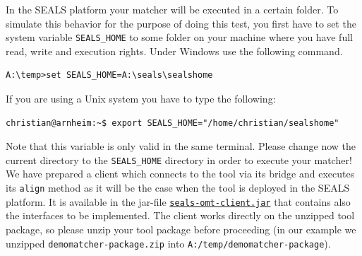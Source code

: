 \documentclass{article}
\begin{document}
In the SEALS platform your matcher will be executed in a certain folder. To simulate this behavior for the purpose of doing this test, you first have to set the system variable \verb|SEALS_HOME| to some folder on your machine where you have full read, write and execution rights. Under Windows use the following command.
\begin{verbatim}
A:\temp>set SEALS_HOME=A:\seals\sealshome
\end{verbatim}
If you are using a Unix system you have to type the following:
\begin{verbatim}
christian@arnheim:~$ export SEALS_HOME="/home/christian/sealshome"
\end{verbatim}
Note that this variable is only valid in the same terminal. Please change now the current directory to the \verb|SEALS_HOME| directory in order to execute your matcher! We have prepared a client which connects to the tool via its bridge and executes its \verb|align| method as it will be the case when the tool is deployed in the SEALS platform. It is available in the jar-file \href{http://oaei.ontologymatching.org/2015/seals-omt-client.jar}{\nolinkurl{seals-omt-client.jar}} that contains also the interfaces to be implemented. The client works directly on the unzipped tool package, so please unzip your tool package before proceeding (in our example we unzipped \verb|demomatcher-package.zip| into \verb|A:/temp/demomatcher-package|).
\end{document}
